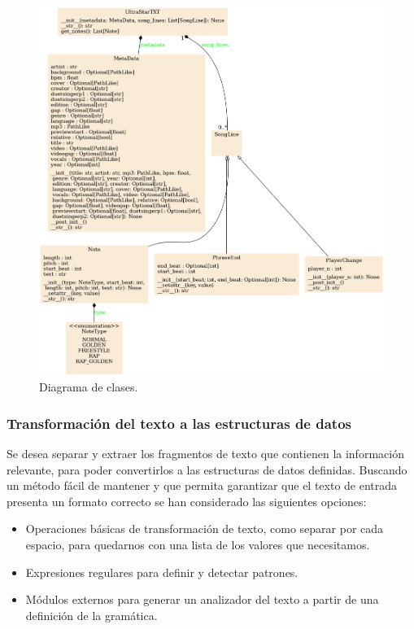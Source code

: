 \begin{figure}[H]
	\includegraphics[width=\linewidth]{logos/classes.png}
	\caption{Diagrama de clases.}
	\label{fig:class1}
\end{figure}

\subsubsection{Transformación del texto a las estructuras de datos}

Se desea separar y extraer los fragmentos de texto que contienen la información relevante, para poder convertirlos a las estructuras de datos definidas. Buscando un método fácil de mantener y que permita garantizar que el texto de entrada presenta un formato correcto se han considerado las siguientes opciones:

\begin{itemize}
	\item{Operaciones básicas de transformación de texto, como separar por cada espacio, para quedarnos con una lista de los valores que necesitamos.}
	\item{Expresiones regulares para definir y detectar patrones.}
	\item{Módulos externos para generar un analizador del texto a partir de una definición de la gramática.}
\end{itemize}



